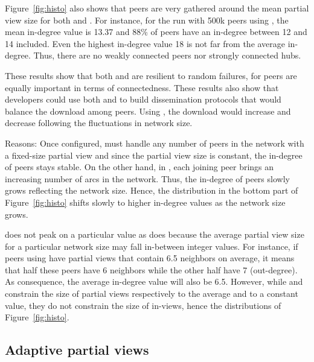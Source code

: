 \begin{asparadesc}
  Figure~\ref{fig:histo} also shows that peers are very gathered around the mean
  partial view size for both \SPRAY and \CYCLON. For instance, for the run with
  500k peers using \SPRAY, the mean in-degree value is 13.37 and 88\% of peers
  have an in-degree between 12 and 14 included. Even the highest in-degree value
  18 is not far from the average in-degree. Thus, there are no weakly connected
  peers nor strongly connected hubs.

  These results show that both \SPRAY and \CYCLON are resilient to random
  failures, for peers are equally important in terms of connectedness. These
  results also show that developers could use both \SPRAY and \CYCLON to build
  dissemination protocols that would balance the download among peers. Using
  \SPRAY, the download would increase and decrease following the fluctuations in
  network size.

\item[Reasons:] Once configured, \CYCLON must handle any number of peers in the
  network with a fixed-size partial view and since the partial view size is
  constant, the in-degree of peers stays stable.  On the other hand, in \SPRAY,
  each joining peer brings an increasing number of arcs in the network. Thus,
  the in-degree of peers slowly grows reflecting the network size. Hence, the
  distribution in the bottom part of Figure~\ref{fig:histo} shifts slowly to
  higher in-degree values as the network size grows.

  \SPRAY does not peak on a particular value as \CYCLON does because the average
  partial view size for a particular network size may fall in-between integer
  values. For instance, if peers using \SPRAY have partial views that contain
  6.5 neighbors on average, it means that half these peers have 6 neighbors
  while the other half have 7 (out-degree). As consequence, the average
  in-degree value will also be 6.5. However, while \SPRAY and \CYCLON constrain
  the size of partial views respectively to the average and to a constant value,
  they do not constrain the size of in-views, hence the distributions of
  Figure~\ref{fig:histo}.
\end{asparadesc}


\subsection{Adaptive partial views}

